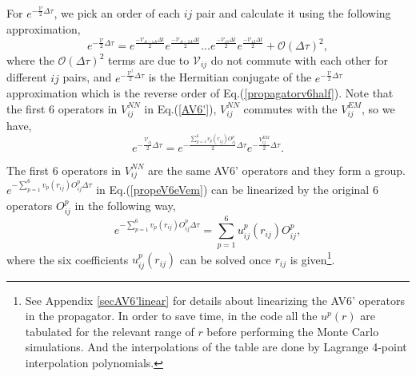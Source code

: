 \documentclass[12pt,letterpaper,UTF8]{report}
\begin{document}
For $e^{-\frac{\mathcal{V}}{2}\Delta \tau }$, we pick an order of each $ij$ pair and calculate it using the following approximation,
\begin{equation}
e^{-\frac{\mathcal{V}}{2} \Delta \tau }
= e^{\frac{-\mathcal{V}_{A-1 A} \Delta t}{2}}
e^{\frac{-\mathcal{V}_{A-2 A} \Delta t}{2}}
...
e^{\frac{-\mathcal{V}_{13}  \Delta t}{2}}
e^{\frac{-\mathcal{V}_{12} \Delta t}{2}}
+ \mathcal{O}(\Delta \tau)^2 ,
\label{propagatorv6half}
\end{equation}
where the $\mathcal{O}(\Delta \tau)^2$ terms are due to $\mathcal{V}_{ij}$ do not commute with each other for different $ij$ pairs, and $e^{-\frac{\mathcal{V}^\dagger}{2} \Delta \tau}$ is the Hermitian conjugate of the $e^{-\frac{\mathcal{V}}{2}\Delta \tau }$ approximation which is the reverse order of Eq.(\ref{propagatorv6half}).
Note that the first 6 operators in $V^{NN}_{ij}$ in Eq.(\ref{AV6'}), $V^{NN}_{ij}$ commutes with the $V_{ij}^{EM}$, so we have,
\begin{equation}
e^{ - \frac{\mathcal{V}_{ij }}{2}\Delta \tau}
=  e^{ - \frac{\sum_{p=1}^6 v_p(r_{ij}) O_{ij}^p }{2}\Delta \tau}
 e^{ - \frac{V^{EM}_{ij} }{2}\Delta \tau} .
 \label{propeV6eVem}
\end{equation}

The first 6 operators in  $V^{NN}_{ij}$ are the same AV6' operators and they form a group.
$e^{ - \sum_{p=1}^6 v_p(r_{ij}) O_{ij}^p  \Delta \tau}$ in Eq.(\ref{propeV6eVem}) can be linearized by the original 6 operators $O^p_{ij}$ in the following way,
\begin{equation}
e^{ - \sum_{p=1}^6 v_p(r_{ij}) O_{ij}^p \Delta \tau }  =
 \sum_{p=1}^6 u^p_{ij} (r_{ij}) O^p_{ij} ,
\label{eVlinear}
\end{equation}
where the six coefficients $u^p_{ij} (r_{ij}) $ can be solved once $r_{ij}$ is given\footnote{See Appendix \ref{secAV6'linear} for details about linearizing the AV6' operators in the propagator. In order to save time, in the code all the $u^p(r)$ are tabulated for the relevant range of $r$ before performing the Monte Carlo simulations. And the interpolations of the table are done by Lagrange 4-point interpolation polynomials.}.
\end{document}
